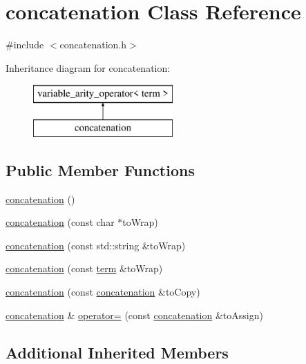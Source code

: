 \hypertarget{classconcatenation}{}\section{concatenation Class Reference}
\label{classconcatenation}


{\ttfamily \#include $<$concatenation.\+h$>$}

Inheritance diagram for concatenation\+:\begin{figure}[H]
\begin{center}
\leavevmode
\includegraphics[height=2.000000cm]{classconcatenation}
\end{center}
\end{figure}
\subsection*{Public Member Functions}
\begin{DoxyCompactItemize}
\item 
\mbox{\hyperlink{classconcatenation_a966de47611a85f21383ea4a39bd52f0e}{concatenation}} ()
\item 
\mbox{\hyperlink{classconcatenation_a51071970bbd79a68b5db24caa120fb63}{concatenation}} (const char $\ast$to\+Wrap)
\item 
\mbox{\hyperlink{classconcatenation_aa24a6ee401a7ab38ce7ce62ba23ed702}{concatenation}} (const std\+::string \&to\+Wrap)
\item 
\mbox{\hyperlink{classconcatenation_ad7a13dd8fb1182a5ff10b097ddb0140e}{concatenation}} (const \mbox{\hyperlink{classterm}{term}} \&to\+Wrap)
\item 
\mbox{\hyperlink{classconcatenation_ab174cf51c648af032f54ed399fa14f34}{concatenation}} (const \mbox{\hyperlink{classconcatenation}{concatenation}} \&to\+Copy)
\item 
\mbox{\hyperlink{classconcatenation}{concatenation}} \& \mbox{\hyperlink{classconcatenation_a6d3051ed72d4f7412cbbea509f28c8a4}{operator=}} (const \mbox{\hyperlink{classconcatenation}{concatenation}} \&to\+Assign)
\end{DoxyCompactItemize}
\subsection*{Additional Inherited Members}


